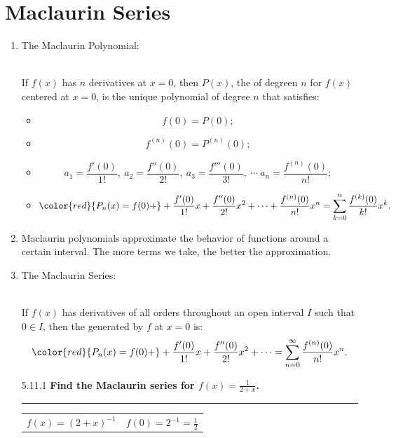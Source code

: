 \documentclass[12pt, a4paper]{article}
\begin{document}
\section{Maclaurin Series}
\begin{enumerate}
    \item The Maclaurin Polynomial: 
    \begin{myclaim}{ }{}
        \\If $f(x)$ has $n$ derivatives at $x=0$, then $P(x)$, the \textbf{\color{red}{Maclaurin polynomial}} of degreen $n$ for $f(x)$ centered at $x=0$, is the unique polynomial of degree $n$ that satisfies: 
        \begin{itemize}
            \item $$f(0)=P(0);$$
            \item $$f^{(n)}(0)=P^{(n)}(0);$$
            \item $$a_1=\frac{f'(0)}{1!},\ a_2=\frac{f''(0)}{2!},\ a_3=\frac{f'''(0)}{3!},\ \cdots\ a_n=\frac{f^{(n)}(0)}{n!};$$
            \item $${\color{red}{P_n(x)=f(0)+}+\frac{f'(0)}{1!}x+\frac{f''(0)}{2!}x^2+\cdots+\frac{f^{(n)}(0)}{n!}x^n=\sum_{k=0}^n\frac{f^{(k)}(0)}{k!}x^k}.$$
        \end{itemize}
    \end{myclaim}
    \item Maclaurin polynomials approximate the behavior of functions around a certain interval. The more terms we take, the better the approximation.
    \item The Maclaurin Series: 
    \begin{myclaim}{ }{}
        \\If $f(x)$ has derivatives of all orders throughout an open interval $I$ such that $0\in I$, then the \textbf{\color{red}{Maclaurin series}} generated by $f$ at $x=0$ is: 
        $${\color{red}{P_n(x)=f(0)+}+\frac{f'(0)}{1!}x+\frac{f''(0)}{2!}x^2+\cdots=\sum_{n=0}^\infty\frac{f^{(n)}(0)}{n!}x^n}.$$
    \end{myclaim}
    {\color{green}{A series converges when the sum of them is a constant (a limit can be found).}}
    \begin{example}{5.11.1}{}
        \textbf{Find the Maclaurin series for $f(x)=\frac{1}{2+x}$.}\\
        \noindent\rule[0.1pt]{\textwidth}{1pt}
        \begin{center}\begin{tabular}{c|c} 
            $f(x)=(2+x)^{-1}$&$f(0)=2^{-1}=\frac{1}{2}$\\

\end{tabular}
\end{center}
\end{example}
\end{enumerate}
\end{document}
